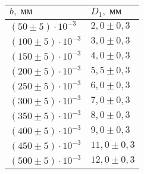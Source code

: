 \begin{tabular}{|l|l|}
\hline
$b,\;\text{мм}$ & $D_1,\;\text{мм}$\\\hline
$\left(50 \pm 5\right)\cdot 10^{-3}$ & $2{,}0 \pm 0{,}3$\\\hline
$\left(100 \pm 5\right)\cdot 10^{-3}$ & $3{,}0 \pm 0{,}3$\\\hline
$\left(150 \pm 5\right)\cdot 10^{-3}$ & $4{,}0 \pm 0{,}3$\\\hline
$\left(200 \pm 5\right)\cdot 10^{-3}$ & $5{,}5 \pm 0{,}3$\\\hline
$\left(250 \pm 5\right)\cdot 10^{-3}$ & $6{,}0 \pm 0{,}3$\\\hline
$\left(300 \pm 5\right)\cdot 10^{-3}$ & $7{,}0 \pm 0{,}3$\\\hline
$\left(350 \pm 5\right)\cdot 10^{-3}$ & $8{,}0 \pm 0{,}3$\\\hline
$\left(400 \pm 5\right)\cdot 10^{-3}$ & $9{,}0 \pm 0{,}3$\\\hline
$\left(450 \pm 5\right)\cdot 10^{-3}$ & $11{,}0 \pm 0{,}3$\\\hline
$\left(500 \pm 5\right)\cdot 10^{-3}$ & $12{,}0 \pm 0{,}3$\\\hline
\end{tabular}
